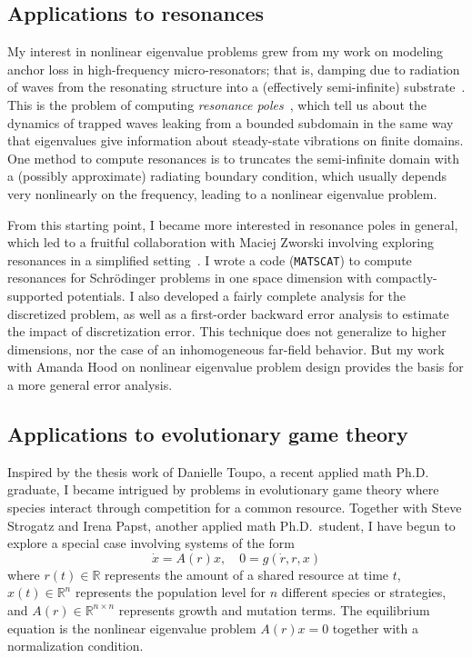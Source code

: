 \documentclass[11pt]{amsart}
\newcommand{\bbR}{\mathbb{R}}
\begin{document}
\subsection*{Applications to resonances}

My interest in nonlinear eigenvalue problems grew from my work on
modeling anchor loss in high-frequency micro-resonators; that is,
damping due to radiation of waves from the resonating structure into a
(effectively semi-infinite)
substrate~\cite{2004-para,2005-mems,2005-ijnme,2005-sensors}.
This is the problem of computing
{\em resonance poles}~\cite{Bindel:2006:ROD,Zworski:1999:RIP},
which tell us about
the dynamics of trapped waves leaking from a bounded
subdomain in the same way that eigenvalues give information about
steady-state vibrations on finite domains.
One method to compute resonances is to truncates the semi-infinite
domain with a (possibly approximate) radiating boundary condition, which
usually depends very nonlinearly on the frequency, leading to a nonlinear
eigenvalue problem.

From this starting point, I became more interested in resonance poles in
general, which led to a fruitful collaboration with Maciej Zworski
involving exploring resonances in a simplified
setting~\cite{2007-symmetry}.
I wrote a code ({\tt MATSCAT}) to compute resonances for
Schr{\"o}dinger problems in one space dimension with compactly-supported
potentials.  I also developed a fairly complete analysis for the
discretized problem, as well
as a first-order backward error analysis to estimate the impact of
discretization error.  This technique does not generalize to higher
dimensions, nor the case of an inhomogeneous far-field behavior.  But
my work with Amanda Hood on nonlinear eigenvalue problem design provides
the basis for a more general error analysis.

\subsection*{Applications to evolutionary game theory}

Inspired by the thesis work of Danielle Toupo, a recent applied math
Ph.D. graduate, I became intrigued by problems in
evolutionary game theory where species interact through competition for
a common resource.  Together with Steve Strogatz and Irena Papst,
another applied math Ph.D.~student, I have begun to explore a
special case involving systems of the form
\[
  \dot{x} = A(r) x, \quad  0 = g(\dot{r}, r, x)
\]
where $r(t) \in \bbR$ represents the amount of a shared resource at
time $t$, $x(t) \in \bbR^n$ represents the population level for $n$
different species or strategies, and $A(r) \in \bbR^{n \times n}$
represents growth and mutation terms.  The equilibrium equation is
the nonlinear eigenvalue problem $A(r) x = 0$ together with a
normalization condition.
\end{document}

